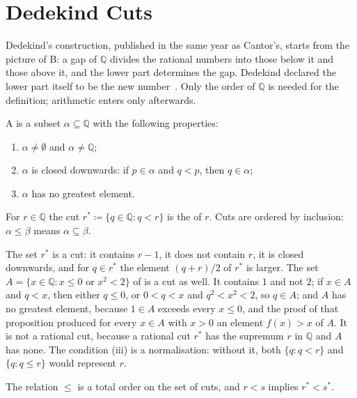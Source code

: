 \section{Dedekind Cuts}
\label{sec:dedekind}

Dedekind's construction, published in the same year as Cantor's, starts from the picture of B: a gap of $\mathbb Q$ divides the rational numbers into those below it and those above it, and the lower part determines the gap. Dedekind declared the lower part itself to be the new number~\cite{dedekind1872}. Only the order of $\mathbb Q$ is needed for the definition; arithmetic enters only afterwards.

\begin{definition}
\label{def:cut}
A  is a subset $\alpha\subseteq\mathbb Q$ with the following properties:
\begin{enumerate}
\item $\alpha\ne\emptyset$ and $\alpha\ne\mathbb Q$;
\item $\alpha$ is closed downwards: if $p\in\alpha$ and $q<p$, then $q\in\alpha$;
\item $\alpha$ has no greatest element.
\end{enumerate}
For $r\in\mathbb Q$ the cut $r^*\coloneqq\{q\in\mathbb Q: q<r\}$ is the  of $r$. Cuts are ordered by inclusion: $\alpha\le\beta$ means $\alpha\subseteq\beta$.
\end{definition}

The set $r^*$ is a cut: it contains $r-1$, it does not contain $r$, it is closed downwards, and for $q\in r^*$ the element $(q+r)/2$ of $r^*$ is larger. The set $A=\{x\in\mathbb Q: x\le0\text{ or }x^2<2\}$ of  is a cut as well. It contains $1$ and not $2$; if $x\in A$ and $q<x$, then either $q\le0$, or $0<q<x$ and $q^2<x^2<2$, so $q\in A$; and $A$ has no greatest element, because $1\in A$ exceeds every $x\le0$, and the proof of that proposition produced for every $x\in A$ with $x>0$ an element $f(x)>x$ of $A$. It is not a rational cut, because a rational cut $r^*$ has the supremum $r$ in $\mathbb Q$ and $A$ has none. The condition (iii) is a normalisation: without it, both $\{q: q<r\}$ and $\{q: q\le r\}$ would represent $r$.

\begin{proposition}
\label{prop:cut-order}
The relation $\le$ is a total order on the set of cuts, and $r<s$ implies $r^*<s^*$.
\end{proposition}

